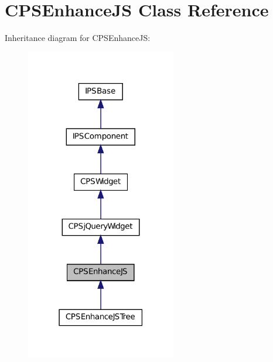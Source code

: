 \hypertarget{classCPSEnhanceJS}{
\section{CPSEnhanceJS Class Reference}
\label{classCPSEnhanceJS}
}


Inheritance diagram for CPSEnhanceJS:\nopagebreak
\begin{figure}[H]
\begin{center}
\leavevmode
\includegraphics[width=186pt]{classCPSEnhanceJS__inherit__graph}
\end{center}
\end{figure}


